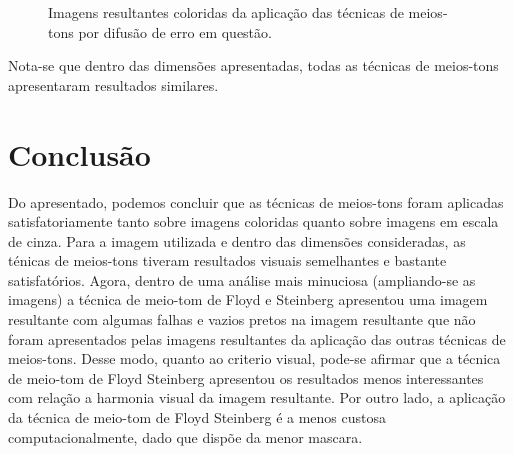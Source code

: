 \documentclass{article}
\begin{document}
\begin{figure}[!htp]
	\qquad
	\quad
	
	\caption{Imagens resultantes coloridas da aplicação das técnicas de meios-tons por difusão de erro em questão.}%
	\label{fig:imagem:plano:baboon}%
\end{figure}

Nota-se que dentro das dimensões apresentadas, todas as técnicas de meios-tons apresentaram resultados similares.

\section{Conclusão}
Do apresentado, podemos concluir que as técnicas de meios-tons foram aplicadas satisfatoriamente tanto sobre imagens coloridas quanto sobre imagens em escala de cinza. Para a imagem utilizada e dentro das dimensões consideradas, as ténicas de meios-tons tiveram resultados visuais semelhantes e bastante satisfatórios. Agora, dentro de uma análise mais minuciosa (ampliando-se as imagens) a técnica de meio-tom de Floyd e Steinberg apresentou uma imagem resultante com algumas falhas e vazios pretos na imagem resultante que não foram apresentados pelas imagens resultantes da aplicação das outras técnicas de meios-tons. Desse modo, quanto ao criterio visual, pode-se afirmar que a técnica de meio-tom de Floyd Steinberg apresentou os resultados menos interessantes com relação a harmonia visual da imagem resultante. Por outro lado, a aplicação da técnica de meio-tom de Floyd Steinberg é a menos custosa computacionalmente, dado que dispõe da menor mascara.
\end{document}

